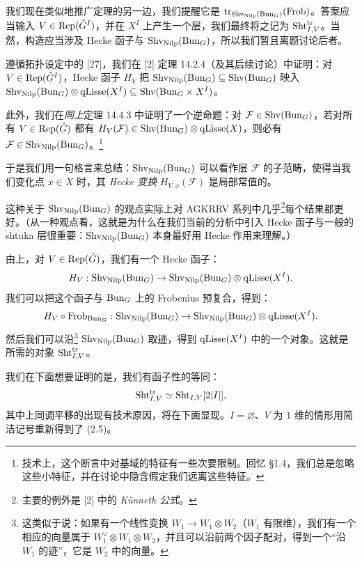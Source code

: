  我们现在类似地推广定理的另一边，我们提醒它是 $\mathrm{tr}_{\mathrm{Shv}_{\mathrm{Nilp}}(\mathrm{Bun}_G)}(\mathrm{Frob})$。答案应当输入 $V \in \mathrm{Rep}(\check{G}^I)$，并在 $X^I$ 上产生一个层，我们最终将之记为 $\mathrm{Sht}^{\mathrm{tr}}_{I,V}$。当然，构造应当涉及 Hecke 函子与 $\mathrm{Shv}_{\mathrm{Nilp}}(\mathrm{Bun}_G)$，所以我们暂且离题讨论后者。

遵循拓扑设定中的 [27]，我们在 [2] 定理 14.2.4（及其后续讨论）中证明：对 $V \in \mathrm{Rep}(\check{G}^I)$，Hecke 函子 $H_V$ 把 $\mathrm{Shv}_{\mathrm{Nilp}}(\mathrm{Bun}_G) \subseteq \mathrm{Shv}(\mathrm{Bun}_G)$ 映入 $\mathrm{Shv}_{\mathrm{Nilp}}(\mathrm{Bun}_G) \otimes \mathrm{qLisse}(X^I) \subseteq \mathrm{Shv}(\mathrm{Bun}_G \times X^I)$。

此外，我们在\emph{同上}定理 14.4.3 中证明了一个逆命题：对 $\mathcal{F} \in \mathrm{Shv}(\mathrm{Bun}_G)$，若对所有 $V \in \mathrm{Rep}(\check{G})$ 都有 $H_V(\mathcal{F}) \in \mathrm{Shv}(\mathrm{Bun}_G) \otimes \mathrm{qLisse}(X)$，则必有 $\mathcal{F} \in \mathrm{Shv}_{\mathrm{Nilp}}(\mathrm{Bun}_G)$。\footnote{技术上，这个断言中对基域的特征有一些次要限制。回忆 §1.4，我们总是忽略这些小特征，并在讨论中隐含假定我们远离这些特征。}

于是我们用一句格言来总结：$\mathrm{Shv}_{\mathrm{Nilp}}(\mathrm{Bun}_G)$ 可以看作层 $\mathcal{F}$ 的子范畴，使得当我们变化点 $x \in X$ 时，其 \emph{Hecke 变换} $H_{V,x}(\mathcal{F})$ 是局部常值的。

这种关于 $\mathrm{Shv}_{\mathrm{Nilp}}(\mathrm{Bun}_G)$ 的观点实际上对 AGKRRV 系列中几乎\footnote{主要的例外是 [2] 中的 \emph{Künneth 公式}。}每个结果都更好。（从一种观点看，这就是为什么在我们当前的分析中引入 Hecke 函子与一般的 shtuka 层很重要：$\mathrm{Shv}_{\mathrm{Nilp}}(\mathrm{Bun}_G)$ 本身最好用 Hecke 作用来理解。）

 由上，对 $V \in \mathrm{Rep}(\check{G})$，我们有一个 Hecke 函子：
\[
  H_V: \mathrm{Shv}_{\mathrm{Nilp}}(\mathrm{Bun}_G) \to \mathrm{Shv}_{\mathrm{Nilp}}(\mathrm{Bun}_G) \otimes \mathrm{qLisse}(X^I).
\]
我们可以把这个函子与 $\mathrm{Bun}_G$ 上的 Frobenius 预复合，得到：
\[
  H_V \circ \mathrm{Frob}_{\mathrm{Bun}_G}: \mathrm{Shv}_{\mathrm{Nilp}}(\mathrm{Bun}_G) \to \mathrm{Shv}_{\mathrm{Nilp}}(\mathrm{Bun}_G) \otimes \mathrm{qLisse}(X^I).
\]
然后我们可以沿\footnote{这类似于说：如果有一个线性变换 $W_1 \to W_1 \otimes W_2$（$W_1$ 有限维），我们有一个相应的向量属于 $W_1^\vee \otimes W_1 \otimes W_2$，并且可以沿前两个因子配对，得到一个“沿 $W_1$ 的迹”，它是 $W_2$ 中的向量。} $\mathrm{Shv}_{\mathrm{Nilp}}(\mathrm{Bun}_G)$ 取迹，得到 $\mathrm{qLisse}(X^I)$ 中的一个对象。这就是所需的对象 $\mathrm{Sht}^{\mathrm{tr}}_{I,V}$。

我们在下面想要证明的是，我们有函子性的等同：
\begin{equation}
  \mathrm{Sht}^{\mathrm{tr}}_{I,V} \simeq \mathrm{Sht}_{I,V}[2|I|],
\end{equation}
其中上同调平移的出现有技术原因，将在下面显现。$I = \varnothing$、$V$ 为 $1$ 维的情形用简洁记号重新得到了 (2.5)。

